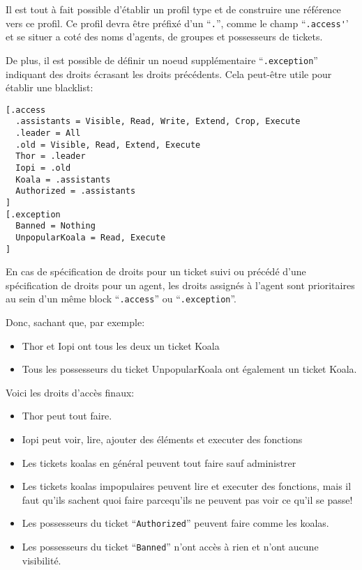 \documentclass[a5paper, 12pt]{book}
\begin{document}
Il est tout à fait possible d'établir un profil type et
de construire une référence vers ce profil. Ce profil
devra être préfixé d'un ``\verb!.!'', comme le champ ``\verb!.access'!'
et se situer a coté des noms d'agents, de groupes et
possesseurs de tickets.

De plus, il est possible de définir un noeud supplémentaire
``\verb!.exception!'' indiquant des droits écrasant les droits
précédents. Cela peut-être utile pour établir une blacklist:

\begin{verbatim}
[.access
  .assistants = Visible, Read, Write, Extend, Crop, Execute
  .leader = All
  .old = Visible, Read, Extend, Execute
  Thor = .leader
  Iopi = .old
  Koala = .assistants
  Authorized = .assistants
]
[.exception
  Banned = Nothing
  UnpopularKoala = Read, Execute
]
\end{verbatim}

En cas de spécification de droits pour un ticket suivi ou
précédé d'une spécification de droits pour un agent, les
droits assignés à l'agent sont prioritaires au sein
d'un même block ``\verb!.access!'' ou ``\verb!.exception!''.

Donc, sachant que, par exemple:

\begin{itemize}
  \item Thor et Iopi ont tous les deux un ticket Koala
  \item Tous les possesseurs du ticket UnpopularKoala ont également
    un ticket Koala.
\end{itemize}

Voici les droits d'accès finaux:

\begin{itemize}
  \item Thor peut tout faire.
  \item Iopi peut voir, lire, ajouter des éléments et executer des fonctions
  \item Les tickets koalas en général peuvent tout faire sauf administrer
  \item Les tickets koalas impopulaires peuvent lire et executer des fonctions,
    mais il faut qu'ils sachent quoi faire parcequ'ils ne peuvent
    pas voir ce qu'il se passe!
  \item Les possesseurs du ticket ``\verb!Authorized!'' peuvent faire comme
    les koalas.
  \item Les possesseurs du ticket ``\verb!Banned!'' n'ont accès à rien et
    n'ont aucune visibilité.
\end{itemize}
\end{document}

